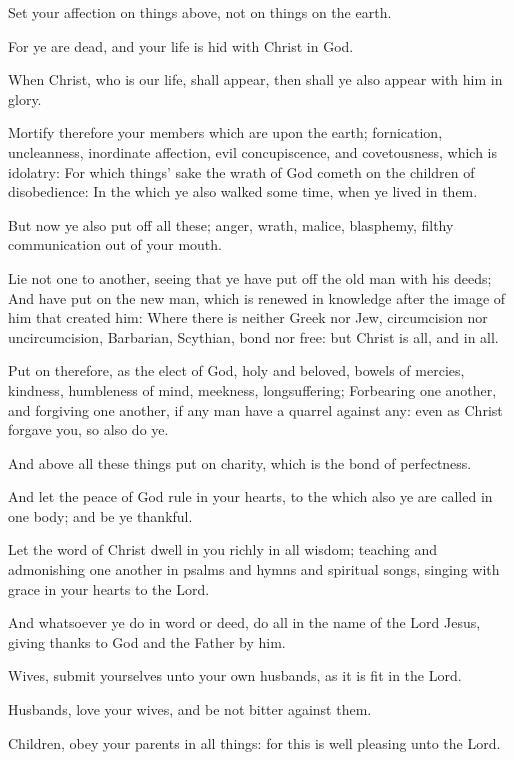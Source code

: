 \verse Set your affection on things above, not on things on the earth.

\verse For ye are dead, and your life is hid with Christ in God.

\verse When Christ, who is our life, shall appear, then shall ye also appear with him in glory.

\verse Mortify therefore your members which are upon the earth; fornication, uncleanness, inordinate affection, evil concupiscence, and covetousness, which is idolatry: \verse For which things' sake the wrath of God cometh on the children of disobedience: \verse In the which ye also walked some time, when ye lived in them.

\verse But now ye also put off all these; anger, wrath, malice, blasphemy, filthy communication out of your mouth.

\verse Lie not one to another, seeing that ye have put off the old man with his deeds; \verse And have put on the new man, which is renewed in knowledge after the image of him that created him: \verse Where there is neither Greek nor Jew, circumcision nor uncircumcision, Barbarian, Scythian, bond nor free: but Christ is all, and in all.

\verse Put on therefore, as the elect of God, holy and beloved, bowels of mercies, kindness, humbleness of mind, meekness, longsuffering; \verse Forbearing one another, and forgiving one another, if any man have a quarrel against any: even as Christ forgave you, so also do ye.

\verse And above all these things put on charity, which is the bond of perfectness.

\verse And let the peace of God rule in your hearts, to the which also ye are called in one body; and be ye thankful.

\verse Let the word of Christ dwell in you richly in all wisdom; teaching and admonishing one another in psalms and hymns and spiritual songs, singing with grace in your hearts to the Lord.

\verse And whatsoever ye do in word or deed, do all in the name of the Lord Jesus, giving thanks to God and the Father by him.

\verse Wives, submit yourselves unto your own husbands, as it is fit in the Lord.

\verse Husbands, love your wives, and be not bitter against them.

\verse Children, obey your parents in all things: for this is well pleasing unto the Lord.

